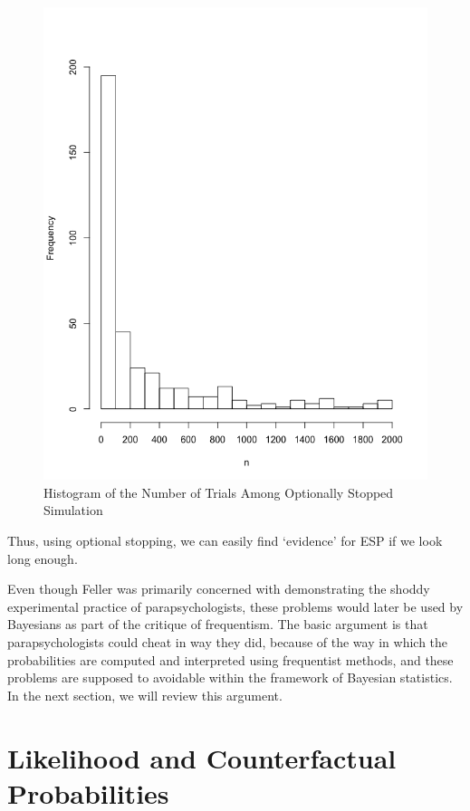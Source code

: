 \begin{figure}[h] 
\begin{center}
\includegraphics[scale=0.3]{freqstopn.png}
	\caption{Histogram of the Number of Trials Among Optionally Stopped Simulation}
	\label{fig:freqhistn}
\end{center}	
\end{figure}


Thus, using optional stopping, we can easily find `evidence' for ESP if
we look long enough.

Even though Feller was primarily concerned with demonstrating the shoddy experimental
practice of parapsychologists, these problems would later be used by Bayesians as part of the critique of frequentism. The basic argument is that
parapsychologists could cheat in way they did, because of the way in
which the probabilities are computed and interpreted using frequentist methods, and these problems
are supposed to avoidable within the framework of Bayesian statistics.
In the next section, we will review this argument.

\hypertarget{likelihood-and-counterfactual-probabilities}{%
\section{Likelihood and Counterfactual
Probabilities}\label{likelihood-and-counterfactual-probabilities}}

